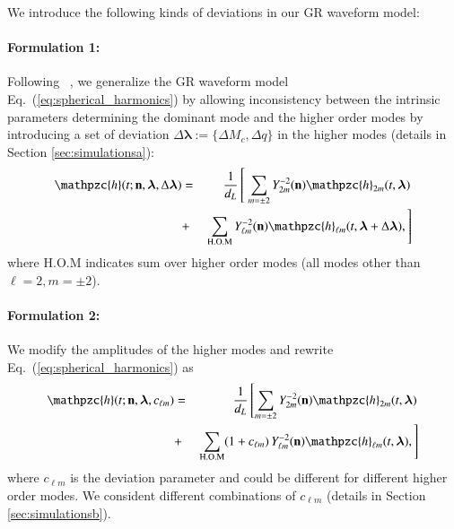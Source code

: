 \documentclass[prd,preprintnumbers,twocolumn,eqsecnum,floatfix,a4paper,nofootinbib,superscriptaddress]{revtex4}
\newcommand{\h}{\mathpzc{h}}
\newcommand{\hlm}{\mathpzc{h}_{\ell m}}
\newcommand{\Ylm}{{Y}^{-2}_{\ell m}}
\newcommand{\blambda}{\bm{\lambda}}
\newcommand{\n}{\mathbf{n}}
\begin{document}

We introduce the following kinds of deviations in our GR waveform model: 

\paragraph{Formulation 1:}
	Following ~\cite{dhanpal2018}, we generalize the GR waveform model Eq.~(\ref{eq:spherical_harmonics}) by allowing inconsistency between the intrinsic parameters determining the dominant mode and the higher order modes by introducing a set of deviation $\Delta \blambda := \{\Delta M_c, \Delta q\}$ in the higher modes (details in Section \ref{sec:simulationsa}):
	\begin{eqnarray}
	\h(t; \n, \blambda, \Delta \blambda) & = &  \frac{1}{d_L} \left[ ~ \sum_{m = \pm2} Y^{-2}_{2m} (\n) {\h}_{2m}(t, \blambda) \right. \nonumber \\ 
	& + & \left. \sum _{\text{H.O.M}} \Ylm (\n) \hlm(t, \blambda+\Delta \blambda), \right]
	\label{eq:test_1}
	\end{eqnarray}
where {H.O.M} indicates sum over higher order modes (all modes other than $\ell = 2, m = \pm 2$). 
	
\paragraph{Formulation 2:}
	We modify the amplitudes of the higher modes and rewrite Eq.~(\ref{eq:spherical_harmonics}) as
	\begin{eqnarray}
	{\h}(t; \n, \blambda, c_{\ell m}) & = & \frac{1}{d_L} \left[ \sum_{m = \pm2} Y^{-2}_{2m} (\n) {\h}_{2m}(t, \blambda)  \right. \nonumber \\ 
	& + & \left. \sum _{\text{H.O.M}} (1+{c_{\ell m}}) \, \Ylm (\n) \hlm(t, \blambda), \right] 
	\label{eq:test_2}
	\end{eqnarray}
	where $c_{\ell m}$ is the deviation parameter and could be different for different higher order modes. We consident different combinations of ${c_{\ell m}}$ (details in Section \ref{sec:simulationsb}). 
	
\end{document}
